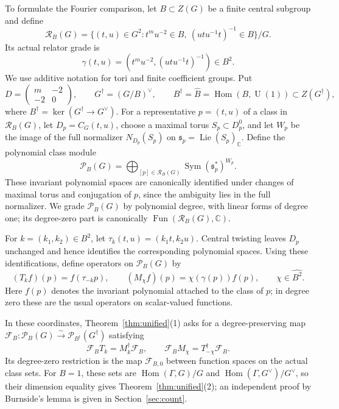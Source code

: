 \documentclass[11pt,a4paper,reqno]{amsart}
\theoremstyle{plain}
\theoremstyle{definition}
\theoremstyle{remark}
\numberwithin{equation}{section}
\DeclareMathOperator{\Hom}{Hom}
\DeclareMathOperator{\Lie}{Lie}
\DeclareMathOperator{\Sym}{Sym}
\newcommand{\UU}{\operatorname{U}}
\newcommand{\CC}{\mathbb C}
\newcommand{\cP}{\mathcal P}
\newcommand{\cR}{\mathcal R}
\DeclareMathOperator{\Fun}{Fun}
\begin{document}
To formulate the Fourier comparison, let $B\subset Z(G)$ be a finite central subgroup and define
\begin{equation}\label{eq:classes}
\cR_B(G)=\{(t,u)\in G^2:t^m u^{-2}\in B,\ (utu^{-1}t)^{-1}\in B\}/G.
\end{equation}
Its actual relator grade is
\[
\gamma(t,u)=(t^m u^{-2},(utu^{-1}t)^{-1})\in B^2.
\]
We use additive notation for tori and finite coefficient groups. Put
\begin{equation}\label{eq:D}
D=\begin{pmatrix}m&-2\\-2&0\end{pmatrix},\qquad G^\dagger=(G/B)^\vee,\qquad B^\dagger=\widehat B=\Hom(B,\UU(1))\subset Z(G^\dagger),
\end{equation}
where $B^\dagger=\ker(G^\dagger\to G^\vee)$. For a representative $p=(t,u)$ of a class in $\cR_B(G)$, let $D_p=C_G(t,u)$, choose a maximal torus $S_p\subset D_p^0$, and let $W_p$ be the image of the full normalizer $N_{D_p}(S_p)$ on $\mathfrak s_p=\Lie(S_p)_{\CC}$. Define the polynomial class module
\begin{equation}\label{eq:gradeddef}
\cP_B(G)=\bigoplus_{[p]\in\cR_B(G)} \Sym(\mathfrak s_p^*)^{W_p}.
\end{equation}
These invariant polynomial spaces are canonically identified under changes of maximal torus and conjugation of $p$, since the ambiguity lies in the full normalizer. We grade $\cP_B(G)$ by polynomial degree, with linear forms of degree one; its degree-zero part is canonically $\Fun(\cR_B(G),\CC)$.

For $k=(k_1,k_2)\in B^2$, let $\tau_k(t,u)=(k_1t,k_2u)$. Central twisting leaves $D_p$ unchanged and hence identifies the corresponding polynomial spaces. Using these identifications, define operators on $\cP_B(G)$ by
\begin{equation}\label{eq:operators}
(T_k f)(p)=f(\tau_{-k}p),\qquad (M_\chi f)(p)=\chi(\gamma(p))f(p),\qquad \chi\in\widehat{B^2}.
\end{equation}
Here $f(p)$ denotes the invariant polynomial attached to the class of $p$; in degree zero these are the usual operators on scalar-valued functions.

In these coordinates, Theorem~\ref{thm:unified}\textup{(1)} asks for a degree-preserving map $\mathcal F_B\colon\cP_B(G)\xrightarrow{\sim}\cP_{B^\dagger}(G^\dagger)$ satisfying
\begin{equation}\label{eq:fourier-rules}
\mathcal F_B T_k=M_k^\dagger\mathcal F_B,\qquad \mathcal F_B M_\chi=T_{-\chi}^\dagger\mathcal F_B.
\end{equation}
Its degree-zero restriction is the map $\mathcal F_{B,0}$ between function spaces on the actual class sets. For $B=1$, these sets are $\Hom(\Gamma,G)/G$ and $\Hom(\Gamma,G^\vee)/G^\vee$, so their dimension equality gives Theorem~\ref{thm:unified}\textup{(2)}; an independent proof by Burnside's lemma is given in Section~\ref{sec:count}.
\end{document}
